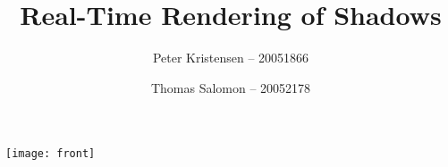 \documentclass[a4paper,final]{scrartcl}
\title{Real-Time Rendering of Shadows}
\author{
  Peter Kristensen -- 20051866 \and
  Thomas Salomon -- 20052178
}
\begin{document}
\maketitle
\begin{centering}
  \texttt{[image: front]}
\end{centering}
\newpage

\tableofcontents











\clearpage
{}


\end{document}
